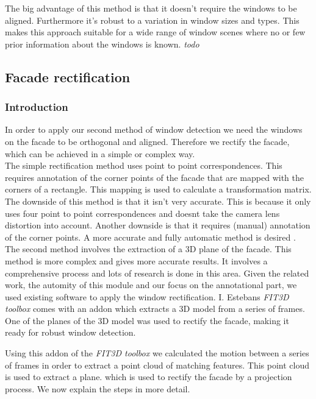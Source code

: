 The big advantage of this method is that it doesn't require the windows to be aligned.
Furthermore it's robust to a variation in window sizes and types. This makes
this approach suitable for a wide range of window scenes where no or few prior
information about the windows is known.
\emph{todo}










\subsection{Facade rectification}
\subsubsection{Introduction}
In order to apply our second method of window detection
we need the windows on the facade to be orthogonal and aligned.
Therefore we rectify the facade, which can be achieved in a simple or complex way.\\

The simple rectification method uses point to point correspondences. This 
requires annotation of the corner points of the facade that are mapped with the
corners of a rectangle. This mapping is used to calculate a transformation matrix. 
 The downside of this method is that it isn't very accurate.
This is because it only uses four point to point correspondences 
 and doesnt take the camera lens distortion into account.
 Another downside is that it requires (manual) annotation of the corner points.
A more accurate and fully automatic method is desired .\\

The second method involves the extraction of a 3D plane of the facade. This 
method is more complex and gives more accurate results. It involves a
comprehensive process and lots of research is done in this area. 
Given the related work, the automity of this module and our focus on the annotational part,
we used existing software to apply the window rectification.
I. Estebans \emph{FIT3D toolbox} \cite{Fit3d} comes with an addon which extracts a 3D model from a
series of frames.  One of the planes of the 3D model was used to rectify the
facade, making it ready for robust window detection. 

Using this addon of the \emph{FIT3D toolbox} \cite{Fit3d} we calculated the motion between a
series of frames in order to extract a point cloud of matching features. This
point cloud is used to extract a plane.  which is used to rectify the facade by
a projection process.  We now explain the steps in more detail.

